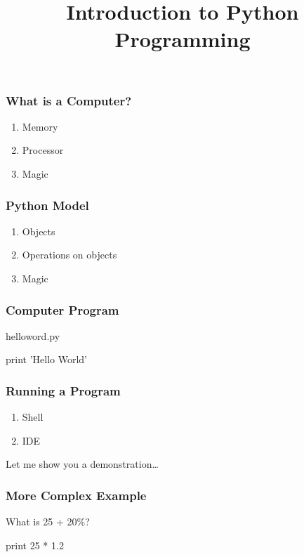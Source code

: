 
\title{Introduction to Python Programming}


\begin{frame}[fragile]
\frametitle{What is a Computer?}

\begin{enumerate}
\item Memory
\item Processor
\item Magic
\end{enumerate}
\end{frame}

\begin{frame}[fragile]
\frametitle{Python Model}

\begin{enumerate}
\item Objects
\item Operations on objects
\item Magic
\end{enumerate}
\end{frame}

\begin{frame}[fragile]
\frametitle{Computer Program}

\begin{block}{helloword.py}
\begin{python}
print 'Hello World'
\end{python}
\end{block}
\end{frame}

\begin{frame}[fragile]
\frametitle{Running a Program}
\begin{enumerate}
\item Shell
\item IDE
\end{enumerate}
\end{frame}

\begin{frame}[fragile]

\bigskip
\bigskip
\bigskip
Let me show you a demonstration\ldots



\end{frame}

\begin{frame}[fragile]
\frametitle{More Complex Example}

What is 25 + 20\%?

\pause
\begin{python}
print 25 * 1.2
\end{python}
\end{frame}

